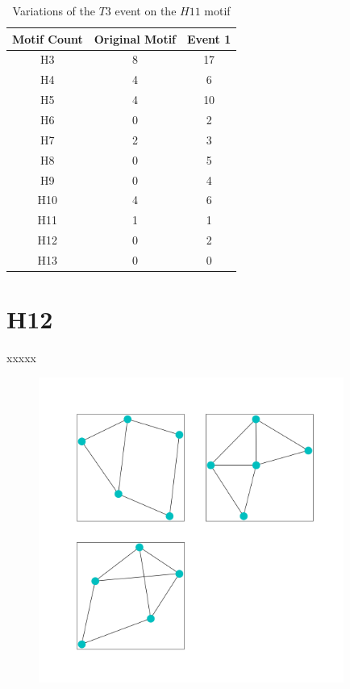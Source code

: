\begin{table}
    \centering
    \begin{tabular}{||c c c ||} 
    \hline
    Motif Count & Original Motif & Event 1 \\ [0.5ex] 
    \hline\hline
    H3 & 8 & 17 \\ 
    \hline
    H4 & 4 & 6  \\
    \hline
    H5 & 4 & 10 \\
    \hline
    H6 & 0 & 2 \\
    \hline
    H7 & 2 & 3 \\
    \hline
    H8 & 0 & 5 \\
    \hline
    H9 & 0 & 4 \\
    \hline
    H10 & 4 & 6 \\
    \hline
    H11 & 1 & 1 \\
    \hline
    H12 & 0 & 2 \\
    \hline
    H13 & 0 & 0 \\
    \hline
   \end{tabular}
   \caption{Variations of the $T3$ event on the $H11$ motif}
   \label{table:20}
\end{table}

\section{H12}
xxxxx

\begin{figure}
    \includegraphics[width=10cm]{Images/H12_T3_evolution.png}
    \centering
\end{figure}

